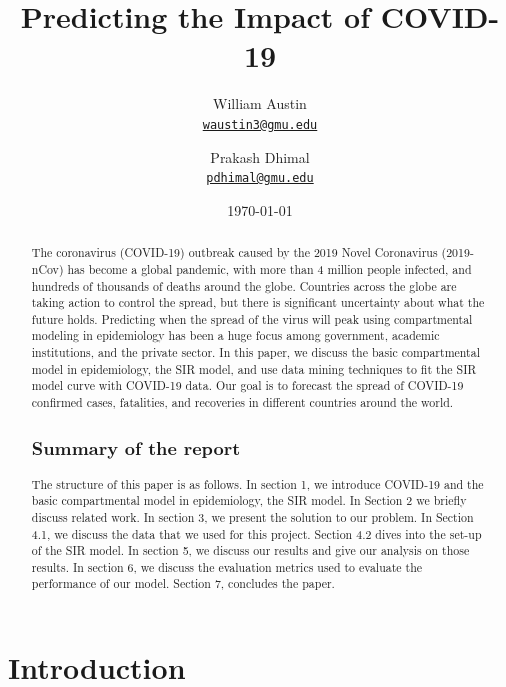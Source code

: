 \documentclass[11pt]{article}
\title{Predicting the Impact of COVID-19
}
\author{William Austin\\%
    \href{mailto:waustin3@gmu.edu}{\texttt{waustin3@gmu.edu}} %
\and Prakash Dhimal\\%
    \href{mailto:pdhimal@gmu.edu}{\texttt{pdhimal@gmu.edu}} %
    }
\date{\today}
\begin{document}
\maketitle
\begin{abstract}

The coronavirus (COVID-19) outbreak caused by the 2019 Novel Coronavirus (2019-nCov) has become a global pandemic, with more than 4 million people infected, and hundreds of thousands of deaths around the globe. Countries across the globe are taking action to control the spread, but there is significant uncertainty about what the future holds. Predicting when the spread of the virus will peak using compartmental modeling in epidemiology has been a huge focus among government, academic institutions, and the private sector. In this paper, we discuss the basic compartmental model in epidemiology, the SIR model, and use data mining techniques to fit the SIR model curve with COVID-19 data. Our goal is to forecast the spread of COVID-19 confirmed cases, fatalities, and recoveries in different countries around the world.

\subsection{Summary of the report}

The structure of this paper is as follows. In section 1, we introduce COVID-19 and the basic compartmental model in epidemiology, the SIR model. In Section 2 we briefly discuss related work. In section 3, we present the solution to our problem. In Section 4.1, we discuss the data that we used for this project. Section 4.2 dives into the set-up of the SIR model. In section 5, we discuss our results and give our analysis on those results. In section 6, we discuss the evaluation metrics used to evaluate the performance of our model. Section 7, concludes the paper.
\end{abstract}

\section{Introduction}
\end{document}
